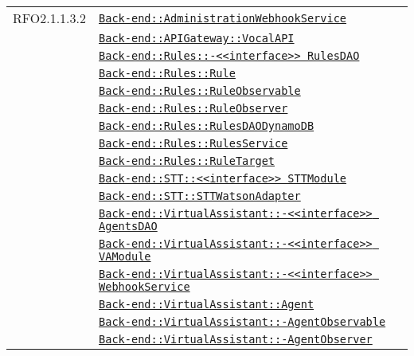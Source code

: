 \begin{longtable}{|>{\centering}m{3cm}|m{10cm}<{\centering}|}
RFO2.1.1.3.2 & \hyperref[Back-end::AdministrationWebhookService]{\texttt{Back-end::AdministrationWebhookService}}\\
& \hyperref[Back-end::APIGateway::VocalAPI]{\texttt{Back-end::APIGateway::VocalAPI}}\\
& \hyperref[Back-end::Rules::<<interface>> RulesDAO]{\texttt{Back-end::Rules::-\linebreak <<interface>> RulesDAO}}\\
& \hyperref[Back-end::Rules::Rule]{\texttt{Back-end::Rules::Rule}}\\
& \hyperref[Back-end::Rules::RuleObservable]{\texttt{Back-end::Rules::RuleObservable}}\\
& \hyperref[Back-end::Rules::RuleObserver]{\texttt{Back-end::Rules::RuleObserver}}\\
& \hyperref[Back-end::Rules::RulesDAODynamoDB]{\texttt{Back-end::Rules::RulesDAODynamoDB}}\\
& \hyperref[Back-end::Rules::RulesService]{\texttt{Back-end::Rules::RulesService}}\\
& \hyperref[Back-end::Rules::RuleTarget]{\texttt{Back-end::Rules::RuleTarget}}\\
& \hyperref[Back-end::STT::<<interface>> STTModule]{\texttt{Back-end::STT::<<interface>> STTModule}}\\
& \hyperref[Back-end::STT::STTWatsonAdapter]{\texttt{Back-end::STT::STTWatsonAdapter}}\\
& \hyperref[Back-end::VirtualAssistant::<<interface>> AgentsDAO]{\texttt{Back-end::VirtualAssistant::-\linebreak <<interface>> AgentsDAO}}\\
& \hyperref[Back-end::VirtualAssistant::<<interface>> VAModule]{\texttt{Back-end::VirtualAssistant::-\linebreak <<interface>> VAModule}}\\
& \hyperref[Back-end::VirtualAssistant::<<interface>> WebhookService]{\texttt{Back-end::VirtualAssistant::-\linebreak <<interface>> WebhookService}}\\
& \hyperref[Back-end::VirtualAssistant::Agent]{\texttt{Back-end::VirtualAssistant::Agent}}\\
& \hyperref[Back-end::VirtualAssistant::AgentObservable]{\texttt{Back-end::VirtualAssistant::-\linebreak AgentObservable}}\\
& \hyperref[Back-end::VirtualAssistant::AgentObserver]{\texttt{Back-end::VirtualAssistant::-\linebreak AgentObserver}}\\

\end{longtable}
